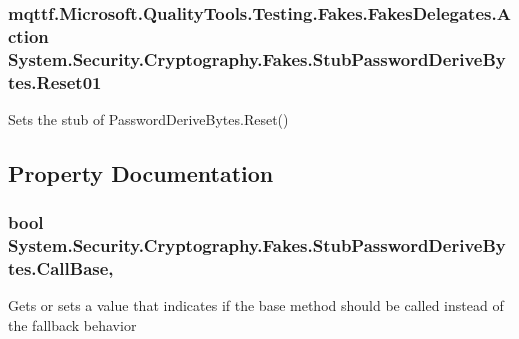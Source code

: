 \hypertarget{class_system_1_1_security_1_1_cryptography_1_1_fakes_1_1_stub_password_derive_bytes_ad1ed81f1c6411beb81b173d147ea5b70}{
\subsubsection[{Reset01}]{\setlength{\rightskip}{0pt plus 5cm}mqttf.\-Microsoft.\-Quality\-Tools.\-Testing.\-Fakes.\-Fakes\-Delegates.\-Action System.\-Security.\-Cryptography.\-Fakes.\-Stub\-Password\-Derive\-Bytes.\-Reset01}}\label{class_system_1_1_security_1_1_cryptography_1_1_fakes_1_1_stub_password_derive_bytes_ad1ed81f1c6411beb81b173d147ea5b70}


Sets the stub of Password\-Derive\-Bytes.\-Reset()



\subsection{Property Documentation}
\hypertarget{class_system_1_1_security_1_1_cryptography_1_1_fakes_1_1_stub_password_derive_bytes_acf32fb0b30f66be256d80165a1619503}{
\subsubsection[{Call\-Base}]{\setlength{\rightskip}{0pt plus 5cm}bool System.\-Security.\-Cryptography.\-Fakes.\-Stub\-Password\-Derive\-Bytes.\-Call\-Base\hspace{0.3cm}{\ttfamily [get]}, {\ttfamily [set]}}}\label{class_system_1_1_security_1_1_cryptography_1_1_fakes_1_1_stub_password_derive_bytes_acf32fb0b30f66be256d80165a1619503}


Gets or sets a value that indicates if the base method should be called instead of the fallback behavior

